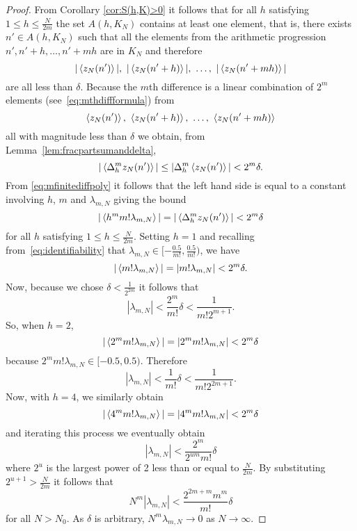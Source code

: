 \documentclass[journal]{IEEEtran}
\begin{document}
\begin{proof}
From Corollary \ref{cor:S(h,K)>0} it follows that for all $h$ satisfying $1\leq h \leq\frac{N}{2m}$ the set $A(h,K_N)$ contains at least one element, that is, there exists $n' \in A(h,K_N)$ such that all the elements from the arithmetic progression $n', n'+h, \dots, n' + mh$ are in $K_N$ and therefore 
\[
\vert \left\langle z_N(n') \right\rangle \vert,\,\, \vert \left\langle z_N(n'+h) \right\rangle \vert, \,\, \dots, \,\, \vert \left\langle z_N(n'+mh) \right\rangle \vert 
\] 
are all less than $\delta$.  Because the $m$th difference is a linear combination of $2^{m}$ elements (see~\eqref{eq:mthdiffformula}) from 
\[
\left\langle z_N(n') \right\rangle, \,\, \left\langle z_N(n'+h) \right\rangle, \,\, \dots, \,\, \left\langle z_N(n'+mh) \right\rangle
\]
all with magnitude less than $\delta$ we obtain, from Lemma~\ref{lem:fracpartsumanddelta},
\begin{equation}\label{eq:Deltazfracbound}
|\left\langle \Delta_h^m z_N(n') \right\rangle| \leq |\Delta_h^m \left\langle  z_N(n') \right\rangle| < 2^{m}\delta.
\end{equation}
From \eqref{eq:mfinitediffpoly} it follows that the left hand side is equal to a constant involving $h$, $m$ and $\lambda_{m,N}$ giving the bound
\begin{equation}\label{eq:startiterativearg}
|\left\langle  h^m m! \lambda_{m,N}  \right\rangle|  = |\left\langle    \Delta_h^m z_N(n')  \right\rangle| < 2^m\delta
\end{equation}
for all $h$ satisfying $1\leq h \leq\frac{N}{2m}$. Setting $h = 1$ and recalling from~\eqref{eq:identifiability} that $\lambda_{m,N} \in [-\tfrac{0.5}{m!}, \tfrac{0.5}{m!})$, we have
 \[
 |\left\langle  m! \lambda_{m,N}  \right\rangle| = | m! \lambda_{m,N} |< 2^m\delta.
 \]
Now, because we chose $\delta < \tfrac{1}{2^{2m}}$ it follows that 
\[
| \lambda_{m,N} |< \frac{2^m}{m!}\delta < \frac{1}{m! 2^{m+1}}.
\]
So, when $h = 2$, 
\[
|\left\langle  2^m m! \lambda_{m,N}  \right\rangle| = | 2^m m! \lambda_{m,N} |< 2^m\delta
\]
because $2^m m! \lambda_{m,N} \in [-0.5, 0.5)$. Therefore
\[
| \lambda_{m,N} |< \frac{1}{m!}\delta < \frac{1}{m! 2^{2m+1}}.
\]
Now, with $h = 4$, we similarly obtain 
\[
|\left\langle  4^m m! \lambda_{m,N}  \right\rangle| = | 4^m m! \lambda_{m,N} |< 2^m\delta
\]
and iterating this process we eventually obtain 
\[
| \lambda_{m,N} | < \frac{2^m}{2^{um} m!}\delta
\]
where $2^u$ is the largest power of 2 less than or equal to $\tfrac{N}{2m}$.  %
By substituting $2^{u+1} > \frac{N}{2m}$ it follows that
 \begin{equation}\label{eq:enditerativearg}
 N^m|\lambda_{m,N}| < \frac{2^{2m+m}m^m}{m!}\delta
 \end{equation}
for all $N > N_0$.  As $\delta$ is arbitrary, $N^m \lambda_{m,N} \rightarrow 0$ as $N\rightarrow \infty$.


\end{proof}
\end{document}
